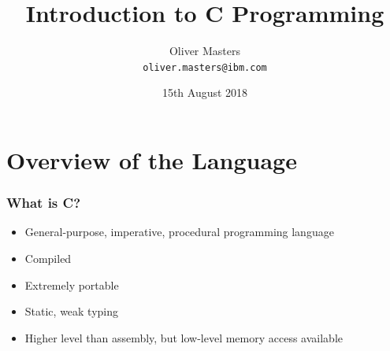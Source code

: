 \documentclass{beamer}
\title{Introduction to C Programming}
\author{Oliver Masters \\ \texttt{oliver.masters@ibm.com}}
\date{15th August 2018}
\begin{document}
\begin{frame}
\titlepage
\end{frame}

\section{Overview of the Language}

\begin{frame}
    \frametitle{What is C?}
    \begin{itemize}[<+->]
        \item General-purpose, imperative, procedural  programming language
        \item Compiled
        \item Extremely portable
        \item Static, weak typing 
        \item Higher level than assembly, but low-level memory access available
    \end{itemize}
\end{frame}
\end{document}

